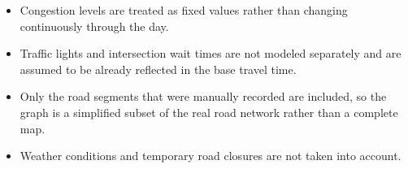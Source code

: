 \begin{itemize}[itemsep=2pt]
  \item Congestion levels are treated as fixed values rather than changing continuously through the day.
  \item Traffic lights and intersection wait times are not modeled separately and are assumed to be already reflected in the base travel time.
  \item Only the road segments that were manually recorded are included, so the graph is a simplified subset of the real road network rather than a complete map.
  \item Weather conditions and temporary road closures are not taken into account.
\end{itemize}
